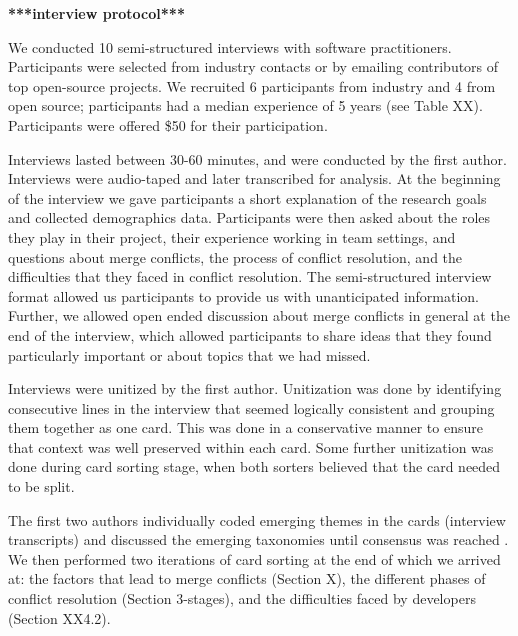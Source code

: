 \textbf{***interview protocol***}

We conducted 10 semi-structured interviews with software practitioners. Participants were selected from industry contacts or by emailing contributors of top open-source projects. We recruited 6 participants from industry and 4 from open source; participants had a median experience of 5 years (see Table XX). Participants were offered \$50 for their participation.  

Interviews lasted between 30-60 minutes, and were conducted by the first author. Interviews were audio-taped and later transcribed for analysis. At the beginning of the interview we gave participants a short explanation of the research goals and collected demographics data. Participants were then asked about the roles they play in their project, their experience working in team settings, and questions about merge conflicts, the process of conflict resolution, and the difficulties that they faced in conflict resolution. The semi-structured interview format allowed us participants to provide us with unanticipated information. Further, we allowed open ended discussion about merge conflicts in general at the end of the interview, which allowed participants to share ideas that they found particularly important or about topics that we had missed. 


Interviews were unitized \cite{unitization} by the first author. Unitization was done by identifying consecutive lines in the interview that seemed logically consistent and grouping them together as one card. This was done in a conservative manner to ensure that context was well preserved within each card. Some further unitization was done during card sorting stage, when both sorters believed that the card needed to be split.


The first two authors individually coded emerging themes in the cards (interview transcripts) and discussed the emerging taxonomies until consensus was reached \cite{card_sort}. We then performed two iterations of card sorting at the end of which we arrived at: the factors that lead to merge conflicts (Section X), the different phases of conflict resolution (Section 3-stages), and the difficulties faced by developers (Section XX4.2).

